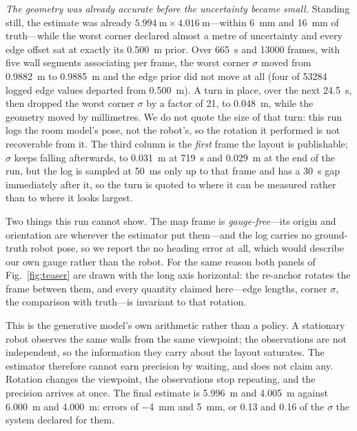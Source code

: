 \documentclass[conference,letterpaper,10pt]{IEEEtran}
\begin{document}
\emph{The geometry was already accurate before the uncertainty became small.} Standing still, the
estimate was already
$\SI{5.994}{\meter} \times \SI{4.016}{\meter}$---within \SI{6}{\milli\meter} and \SI{16}{\milli\meter} of truth---while
the worst corner declared almost a metre of uncertainty and every edge offset sat at exactly its
\SI{0.500}{\meter} prior. Over \SI{665}{\second} and \num{13000} frames, with five wall segments
associating per frame, the worst corner $\sigma$ moved from \SI{0.9882}{\meter} to \SI{0.9885}{\meter} and
the edge prior did not move at all (four of \num{53284} logged edge values departed from
\SI{0.500}{\meter}). A turn in place, over the next \SI{24.5}{\second}, then dropped the worst corner
$\sigma$ by a factor of \num{21}, to \SI{0.048}{\meter}, while the geometry moved by millimetres. We
do not quote the size of that turn: this run logs the room model's pose, not the robot's, so the
rotation it performed is not recoverable from it. The third column is the \emph{first} frame the layout is publishable; $\sigma$
keeps falling afterwards, to \SI{0.031}{\meter} at \SI{719}{\second} and \SI{0.029}{\meter} at the
end of the run, but the log is sampled at
\SI{50}{\milli\second} only up to that frame and has a \SI{30}{\second} gap immediately after it, so
the turn is quoted to where it can be measured rather than to where it looks largest.

Two things this run cannot show. The map frame is \emph{gauge-free}---its origin and orientation are
wherever the estimator put them---and the log carries no ground-truth robot pose, so we report the
no heading error at all, which would describe our own gauge rather than the robot. For the same
reason both panels of Fig.~\ref{fig:teaser}
are drawn with the long axis horizontal: the re-anchor rotates the frame between them, and every
quantity claimed here---edge lengths, corner $\sigma$, the comparison with truth---is invariant to
that rotation.

This is the generative model's own arithmetic rather than a policy. A stationary robot observes the
same walls from the same viewpoint; the observations are not independent, so the information they
carry about the layout saturates. The estimator therefore cannot earn precision by waiting, and does
not claim any. Rotation changes the viewpoint, the observations stop repeating, and the precision
arrives at once. The final estimate is \SI{5.996}{\meter} and \SI{4.005}{\meter} against \SI{6.000}{\meter} and
\SI{4.000}{\meter}: errors of \SI{-4}{\milli\meter} and \SI{+5}{\milli\meter}, or \num{0.13} and \num{0.16} of
the $\sigma$ the system declared for them.
\end{document}
